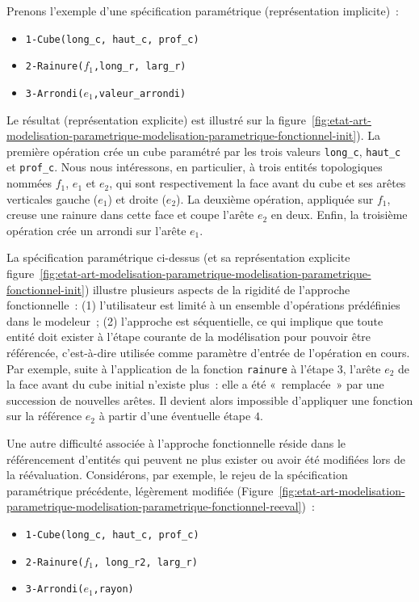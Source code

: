 Prenons l'exemple d'une spécification paramétrique (représentation implicite)~: %
\begin{itemize}
	\item \texttt{1-Cube(long\_c, haut\_c, prof\_c)}
	\item \texttt{2-Rainure($f_{1}$,long\_r, larg\_r)}
	\item \texttt{3-Arrondi($e_{1}$,valeur\_arrondi)}
\end{itemize}



Le résultat (représentation explicite) est illustré sur la
figure~\ref{fig:etat-art-modelisation-parametrique-modelisation-parametrique-fonctionnel-init}). La première opération crée un cube paramétré par les trois valeurs
\texttt{long\_c}, \texttt{haut\_c} et \texttt{prof\_c}. %
Nous nous intéressons, en particulier, à trois entités topologiques nommées $f_{1}$, $e_{1}$ et $e_{2}$, qui
sont respectivement la face avant du cube et ses arêtes verticales gauche
($e_{1}$) et droite ($e_{2}$). %
La deuxième opération, appliquée sur $f_{1}$, creuse une rainure dans cette face et coupe l'arête $e_{2}$
en deux. %
Enfin, la troisième opération crée un arrondi sur l'arête $e_{1}$. %


La spécification paramétrique ci-dessus (et sa représentation explicite
figure~\ref{fig:etat-art-modelisation-parametrique-modelisation-parametrique-fonctionnel-init})
illustre plusieurs aspects de la rigidité de l'approche fonctionnelle~: %
(1) l'utilisateur est limité à un ensemble d'opérations prédéfinies dans le modeleur~; (2) l'approche est séquentielle, ce qui implique que toute entité doit exister à l'étape courante de la modélisation pour pouvoir être référencée, c'est-à-dire utilisée comme paramètre d'entrée de l'opération en cours. Par exemple, suite à l'application de la fonction \texttt{rainure} à l'étape $3$, l'arête $e_{2}$ de la face avant du cube initial n'existe plus~: elle a été «~remplacée~» par une succession de nouvelles arêtes. Il devient alors impossible d'appliquer une fonction sur la référence $e_{2}$ à partir d'une éventuelle étape $4$. %


Une autre difficulté associée à l'approche fonctionnelle réside dans le référencement d'entités qui peuvent ne plus exister ou avoir été modifiées lors de la réévaluation. Considérons, par exemple, le rejeu de la spécification paramétrique précédente, légèrement modifiée (Figure~\ref{fig:etat-art-modelisation-parametrique-modelisation-parametrique-fonctionnel-reeval})~:
\begin{itemize}
	\item \texttt{1-Cube(long\_c, haut\_c, prof\_c)}
	\item \texttt{2-Rainure($f_{1}$, long\_r2, larg\_r)}
	\item \texttt{3-Arrondi($e_{1}$,rayon)} %
\end{itemize} %

